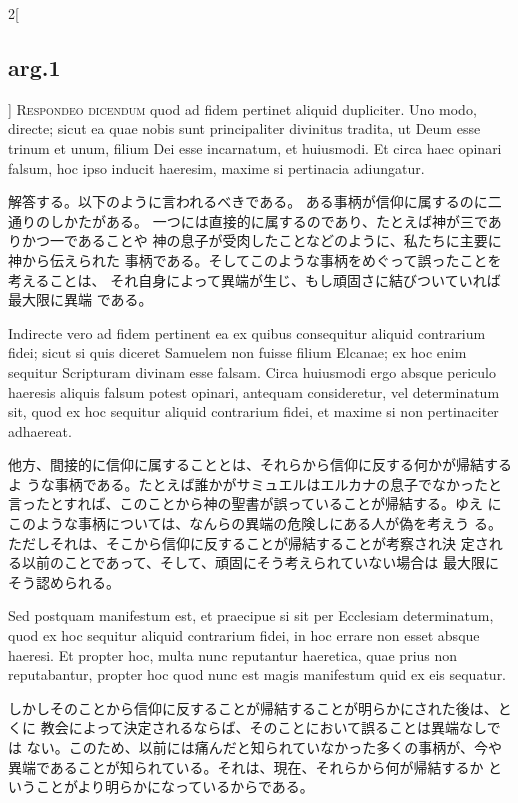 \documentclass[paper=a4paper,fontsize=10pt,jafontsize=9pt,titlepage]{jlreq}
\begin{document}
\begin{paracol}{2}[\subsection{arg.1}]
{\scshape Respondeo dicendum} quod ad fidem pertinet aliquid dupliciter. Uno
modo, directe; sicut ea quae nobis sunt principaliter divinitus
tradita, ut Deum esse trinum et unum, filium Dei esse incarnatum, et
huiusmodi. Et circa haec opinari falsum, hoc ipso inducit haeresim,
maxime si pertinacia adiungatur.

\switchcolumn

解答する。以下のように言われるべきである。
ある事柄が信仰に属するのに二通りのしかたがある。
一つには直接的に属するのであり、たとえば神が三でありかつ一であることや
 神の息子が受肉したことなどのように、私たちに主要に神から伝えられた
 事柄である。そしてこのような事柄をめぐって誤ったことを考えることは、
 それ自身によって異端が生じ、もし頑固さに結びついていれば最大限に異端
 である。

\switchcolumn*

Indirecte vero ad fidem pertinent ea
ex quibus consequitur aliquid contrarium fidei; sicut si quis diceret
Samuelem non fuisse filium Elcanae; ex hoc enim sequitur Scripturam
divinam esse falsam. Circa huiusmodi ergo absque periculo haeresis
aliquis falsum potest opinari, antequam consideretur, vel determinatum
sit, quod ex hoc sequitur aliquid contrarium fidei, et maxime si non
pertinaciter adhaereat.

\switchcolumn

他方、間接的に信仰に属することとは、それらから信仰に反する何かが帰結するよ
 うな事柄である。たとえば誰かがサミュエルはエルカナの息子でなかったと
 言ったとすれば、このことから神の聖書が誤っていることが帰結する。ゆえ
 にこのような事柄については、なんらの異端の危険しにある人が偽を考えう
 る。ただしそれは、そこから信仰に反することが帰結することが考察され決
 定される以前のことであって、そして、頑固にそう考えられていない場合は
 最大限にそう認められる。

\switchcolumn*

Sed postquam manifestum est, et praecipue si
sit per Ecclesiam determinatum, quod ex hoc sequitur aliquid
contrarium fidei, in hoc errare non esset absque haeresi. Et propter
hoc, multa nunc reputantur haeretica, quae prius non reputabantur,
propter hoc quod nunc est magis manifestum quid ex eis sequatur.

\switchcolumn

しかしそのことから信仰に反することが帰結することが明らかにされた後は、とくに
 教会によって決定されるならば、そのことにおいて誤ることは異端なしでは
 ない。このため、以前には痛んだと知られていなかった多くの事柄が、今や
 異端であることが知られている。それは、現在、それらから何が帰結するか
 ということがより明らかになっているからである。


\end{paracol}
\end{document}
